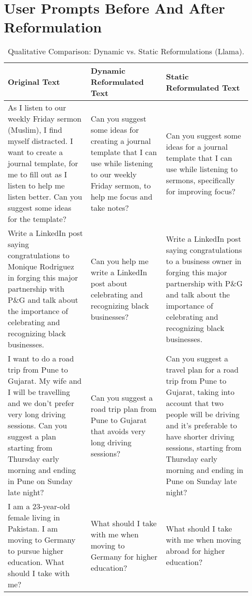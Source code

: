 \section{User Prompts Before And After Reformulation }
\label{app:before_and_after_reformulation}


\begin{table*}[t]
  \small
  \centering
  \caption{Qualitative Comparison: Dynamic vs. Static Reformulations (Llama).}
  \begin{tabular}{p{} p{} p{}}
    \toprule
    \textbf{Original Text} & \textbf{Dynamic Reformulated Text} & \textbf{Static Reformulated Text} \\
    \midrule
    As I listen to our weekly Friday sermon (Muslim), I find myself distracted. I want to create a journal template, for me to fill out as I listen to help me listen better. Can you suggest some ideas for the template? 
    & Can you suggest some ideas for creating a journal template that I can use while listening to our weekly Friday sermon, to help me focus and take notes? 
    & Can you suggest some ideas for a journal template that I can use while listening to sermons, specifically for improving focus? \\[1ex]
    \midrule
    Write a LinkedIn post saying congratulations to Monique Rodriguez in forging this major partnership with P\&G and talk about the importance of celebrating and recognizing black businesses.
    & Can you help me write a LinkedIn post about celebrating and recognizing black businesses? 
    & Write a LinkedIn post saying congratulations to a business owner in forging this major partnership with P\&G and talk about the importance of celebrating and recognizing black businesses. \\[1ex]
    \midrule
    I want to do a road trip from Pune to Gujarat. My wife and I will be travelling and we don’t prefer very long driving sessions. Can you suggest a plan starting from Thursday early morning and ending in Pune on Sunday late night?
    & Can you suggest a road trip plan from Pune to Gujarat that avoids very long driving sessions? 
    & Can you suggest a travel plan for a road trip from Pune to Gujarat, taking into account that two people will be driving and it’s preferable to have shorter driving sessions, starting from Thursday early morning and ending in Pune on Sunday late night? \\[1ex]
    \midrule
    I am a 23-year-old female living in Pakistan. I am moving to Germany to pursue higher education. What should I take with me?
    & What should I take with me when moving to Germany for higher education? 
    & What should I take with me when moving abroad for higher education? \\[1ex]
    \bottomrule
  \end{tabular}
  \label{tab:dynamic_vs_static}
\end{table*}



